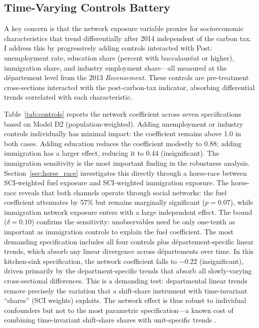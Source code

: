 \documentclass[12pt]{article}
\newcommand{\dept}{d\'{e}partement}
\newcommand{\depts}{d\'{e}partements}
\begin{document}
\subsection{Time-Varying Controls Battery}

A key concern is that the network exposure variable proxies for socioeconomic characteristics that trend differentially after 2014 independent of the carbon tax. I address this by progressively adding controls interacted with Post: unemployment rate, education share (percent with baccalaur\'{e}at or higher), immigration share, and industry employment share---all measured at the \dept{} level from the 2013 \textit{Recensement}. These controls are pre-treatment cross-sections interacted with the post-carbon-tax indicator, absorbing differential trends correlated with each characteristic.

Table~\ref{tab:controls} reports the network coefficient across seven specifications based on Model D2 (population-weighted). Adding unemployment or industry controls individually has minimal impact: the coefficient remains above 1.0 in both cases. Adding education reduces the coefficient modestly to 0.88; adding immigration has a larger effect, reducing it to 0.44 (insignificant). The immigration sensitivity is the most important finding in the robustness analysis. Section~\ref{sec:horse_race} investigates this directly through a horse-race between SCI-weighted fuel exposure and SCI-weighted immigration exposure. The horse-race reveals that both channels operate through social networks: the fuel coefficient attenuates by 57\% but remains marginally significant ($p = 0.07$), while immigration network exposure enters with a large independent effect. The \citet{oster2019unobservable} bound ($\delta = 0.10$) confirms the sensitivity: unobservables need be only one-tenth as important as immigration controls to explain the fuel coefficient. The most demanding specification includes all four controls plus \dept{}-specific linear trends, which absorb any linear divergence across \depts{} over time. In this kitchen-sink specification, the network coefficient falls to $-0.22$ (insignificant), driven primarily by the department-specific trends that absorb all slowly-varying cross-sectional differences. This is a demanding test: departmental linear trends remove precisely the variation that a shift-share instrument with time-invariant ``shares'' (SCI weights) exploits. The network effect is thus robust to individual confounders but not to the most parametric specification---a known cost of combining time-invariant shift-share shares with unit-specific trends \citep{adao2019shift}.
\end{document}
